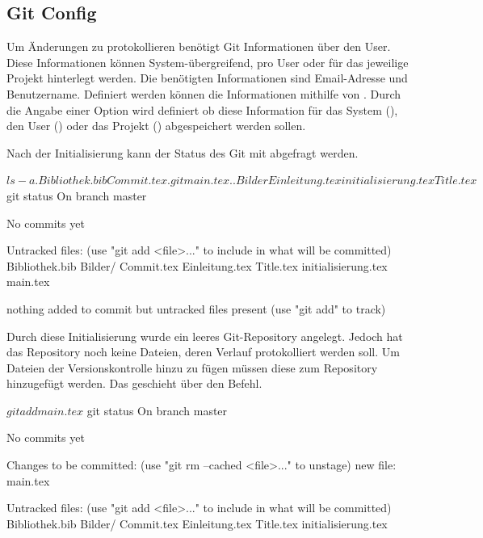 \subsection{Git Config}
Um Änderungen zu protokollieren benötigt Git Informationen über den User. Diese Informationen können System-übergreifend, pro User oder für das jeweilige Projekt hinterlegt werden. Die benötigten Informationen sind Email-Adresse und Benutzername. Definiert werden können die Informationen mithilfe von . Durch die Angabe einer Option wird definiert ob diese Information für das System (), den User () oder das Projekt () abgespeichert werden sollen.
Nach der Initialisierung kann der Status des Git mit  abgefragt werden.
\begin{mplisting}
$ ls -a
.   Bibliothek.bib  Commit.tex      .git                 main.tex
..  Bilder          Einleitung.tex  initialisierung.tex  Title.tex
$ git status
On branch master

No commits yet

Untracked files:
  (use "git add <file>..." to include in what will be committed)
	Bibliothek.bib
	Bilder/
	Commit.tex
	Einleitung.tex
	Title.tex
	initialisierung.tex
	main.tex

nothing added to commit but untracked files present (use "git add" to track)

\end{mplisting}
Durch diese Initialisierung wurde ein leeres Git-Repository angelegt. Jedoch hat das Repository noch keine Dateien, deren Verlauf protokolliert werden soll. Um Dateien der Versionskontrolle hinzu zu fügen müssen diese zum Repository hinzugefügt werden. Das geschieht über den  Befehl.
\begin{mplisting}
$ git add main.tex
$ git status
On branch master

No commits yet

Changes to be committed:
  (use "git rm --cached <file>..." to unstage)
	new file:   main.tex

Untracked files:
  (use "git add <file>..." to include in what will be committed)
	Bibliothek.bib
	Bilder/
	Commit.tex
	Einleitung.tex
	Title.tex
	initialisierung.tex
\end{mplisting}
